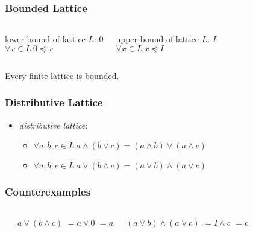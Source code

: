 \documentclass[dvipsnames]{beamer}
\begin{document}
\begin{frame}
  \frametitle{Bounded Lattice}

  \begin{columns}[t]
    \begin{definition}
      lower bound of lattice $L$: $0$\\
      $\forall x \in L~0 \preceq x$
    \end{definition}

    \pause
    \begin{definition}
      upper bound of lattice $L$: $I$\\
      $\forall x \in L~x \preceq I$
    \end{definition}
  \end{columns}

  \pause
  \bigskip
  \begin{theorem}
    Every finite lattice is bounded.
  \end{theorem}
\end{frame}

\begin{frame}
  \frametitle{Distributive Lattice}

  \begin{itemize}
    \item \emph{distributive lattice}:
    \begin{itemize}
      \item $\forall a,b,c \in L~a \wedge (b \vee c) = (a \wedge b) \vee (a \wedge c)$
      \item $\forall a,b,c \in L~a \vee (b \wedge c) = (a \vee b) \wedge (a \vee c)$
    \end{itemize}
  \end{itemize}
\end{frame}

\begin{frame}
  \frametitle{Counterexamples}

  \begin{example}
    \begin{columns}
      \begin{center}
      \end{center}

      \pause
      $a \vee (b \wedge c)$ \pause $= a \vee 0$ \pause $= a$

      \pause
      $(a \vee b) \wedge (a \vee c)$ \pause $= I \wedge c$ \pause $= c$
    \end{columns}
  \end{example}
\end{frame}
\end{document}
